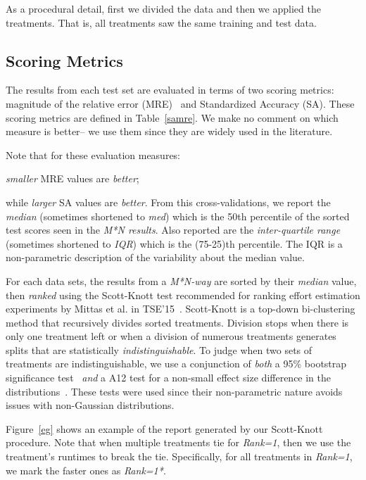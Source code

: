 As a procedural detail, first we divided the data and then we applied the treatments. That is, all treatments saw the same training and test data.


\subsection{Scoring Metrics}

The results from each test set are evaluated in terms of two scoring metrics:  magnitude of the relative error (MRE)~\cite{Conte:1986:SEM:6176} and Standardized Accuracy (SA). These scoring metrics  are defined in Table~\ref{samre}.
We make no comment
on which   measure is better-- we use them since   they are widely used in the literature.

Note that for these evaluation measures:
\bi
\item {\em smaller} MRE values are {\em better};
\item
while {\em larger} SA values are {\em better}.
\ei
From this cross-validations,
we  report the {\em median} (sometimes shortened to {\em med})
which is the 50th percentile of the sorted test scores seen in the {\em M*N results}.
Also reported are the  {\em inter-quartile range} (sometimes shortened to {\em IQR}) which is the (75-25)th percentile.
The IQR is a  non-parametric
description of the   variability about the median value.  

For each data sets, the results from a {\em M*N-way} are sorted by their {\em  median} value, then {\em ranked} using the Scott-Knott test
recommended for ranking effort estimation experiments by Mittas et al. in TSE'15~\cite{Mittas13}. Scott-Knott is a top-down bi-clustering
method that recursively divides sorted treatments. Division stops when there is only one treatment left or when a division of numerous treatments generates 
splits that are statistically {\em indistinguishable}. 
To judge when two sets of treatments are indistinguishable, we use a conjunction of {\em both}  a 95\% bootstrap significance test~\cite{efron93} {\em and}
a A12 test for a non-small effect size difference in the distributions~\cite{MenziesNeg:2017}. These tests were used since their non-parametric nature avoids issues with non-Gaussian
distributions.  

Figure~\ref{eg} shows an example of the report generated by our Scott-Knott procedure.
Note that when multiple treatments tie for {\em Rank=1}, then we use the treatment's
runtimes to break the tie. Specifically, for all treatments in {\em Rank=1}, we mark the faster ones as \colorbox{gray!20}{{\em Rank=1*}}.

